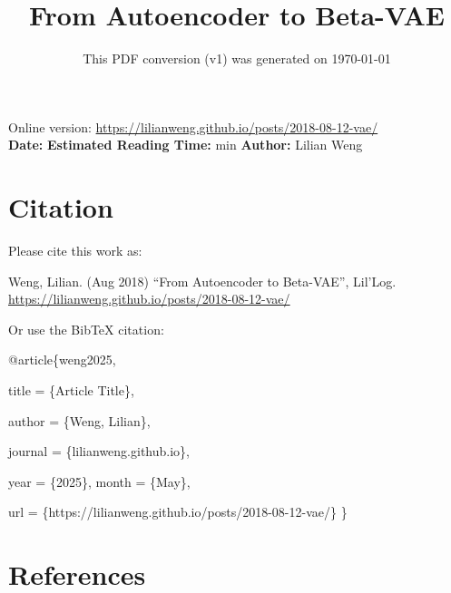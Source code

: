 \documentclass[12pt]{article}
\title{From Autoencoder to Beta-VAE}
\date{This PDF conversion (v1) was generated on \today\footnotemark}
\begin{document}
\maketitle
\begin{center}
    Online version: \url{https://lilianweng.github.io/posts/2018-08-12-vae/} \\
    \textbf{Date:} \quad
    \textbf{Estimated Reading Time:}  min \quad
    \textbf{Author:} Lilian Weng
\end{center}




\newpage
\tableofcontents
\newpage
\vspace{1em}
\n\n\n\section{Citation}
Please cite this work as:

\begin{tcolorbox}[colback=black!5!white, colframe=black!80!white, boxrule=0.5pt, arc=2mm, left=1mm, right=1mm, top=1mm, bottom=1mm]
  Weng, Lilian. (Aug 2018) ``From Autoencoder to Beta-VAE'', Lil'Log. \url{https://lilianweng.github.io/posts/2018-08-12-vae/}
  \end{tcolorbox}

Or use the BibTeX citation:

\begin{tcolorbox}[
    colback=black!5!white,
    colframe=black!80!white,
    boxrule=0.5pt,
    arc=2mm,
    left=1mm,
    right=1mm,
    top=1mm,
    bottom=1mm,
    listing only,
    listing options={
      basicstyle=\ttfamily\footnotesize,
      breaklines=true,
      literate={\{}{{\char`\{}}1 {\}}{{\char`\}}}1
    }
  ]
  @article\{weng2025,

    title   = \{Article Title\},

    author  = \{Weng, Lilian\},

    journal = \{lilianweng.github.io\},

    year    = \{2025\},
    month   = \{May\},

    url     = \{https://lilianweng.github.io/posts/2018-08-12-vae/\}\n
  \}
  \end{tcolorbox}

\newpage
\section{References}

\n
\end{document}
